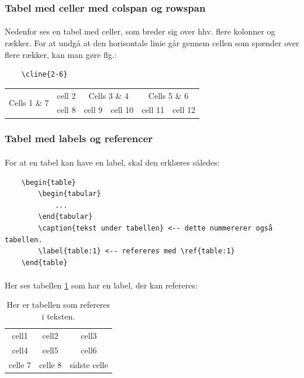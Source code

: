 \documentclass{article}
\begin{document}
\begin{enumerate}
\subsubsection{Tabel med celler med colspan og rowspan}
\paragraph{}
Nedenfor ses en tabel med celler, som breder sig over hhv. flere kolonner og rækker. For at undgå at den horisontale linie går gennem cellen som spænder over flere rækker, kan man gøre flg.:
\begin{verbatim}
    \cline{2-6}
\end{verbatim}

\begin{center}    
    \begin{tabular}{|p{1.5cm}|c|c|c|c|c|}
        \hline
        \multirow{2}{*}{\parbox{1.5cm}{Cells 1 \& 7}}
        & cell 2 & \multicolumn{2}{|c|}{Cells 3 \& 4} & \multicolumn{2}{|c|}{Cells 5 \& 6} \\
        \cline{2-6}
        & cell 8 & cell 9 & cell 10 & cell 11 & cell 12 \\
        \hline
    \end{tabular}
\end{center}
\subsubsection{Tabel med labels og referencer}
\paragraph{}
For at en tabel kan have en label, skal den erklæres således:
\begin{verbatim}
    \begin{table}
        \begin{tabular}
            ...
        \end{tabular}
        \caption{tekst under tabellen} <-- dette nummererer også tabellen.
        \label{table:1} <-- refereres med \ref{table:1}
    \end{table}
\end{verbatim}
\paragraph{}
Her ses tabellen \ref{table:1} som har en label, der kan refereres:
\begin{table}[h!]
    \centering
    \begin{tabular}{ c c c }
        cell1 & cell2 & cell3 \\
        cell4 & cell5 & cell6 \\
        celle 7 & celle 8 & sidste celle
    \end{tabular}
    \caption{Her er tabellen som refereres i teksten.}
    \label{table:1}
\end{table}
\newpage

\end{enumerate}
\end{document}
